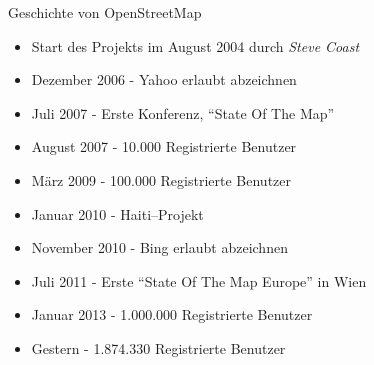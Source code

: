 \documentclass{beamer}
\begin{document}
{

\begin{frame}{Geschichte von OpenStreetMap}
  \vspace{0.6cm}
\begin{itemize}
  \item Start des Projekts im August 2004 durch \emph{Steve Coast}
  \item Dezember 2006 - Yahoo erlaubt abzeichnen
  \item Juli 2007 - Erste Konferenz, "`State Of The Map"'
  \item August 2007 - 10.000 Registrierte Benutzer
  \item März 2009 - 100.000 Registrierte Benutzer
  \item Januar 2010 - Haiti--Projekt
  \item November 2010 - Bing erlaubt abzeichnen
  \item Juli 2011 - Erste "`State Of The Map Europe"' in Wien
  \item Januar 2013 - 1.000.000 Registrierte Benutzer
  \item Gestern - 1.874.330 Registrierte Benutzer
\end{itemize}

\end{frame}
}
\end{document}
